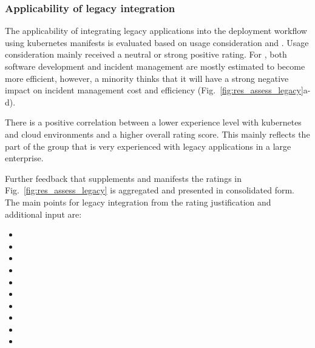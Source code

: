 \documentclass[../main.tex]{subfiles}
\begin{document}
    \subsubsection{Applicability of legacy integration}

    The applicability of integrating legacy applications into the deployment workflow using \gls{kubernetes} manifests is evaluated based on usage consideration and .
    Usage consideration mainly received a neutral or strong positive rating.
    For , both software development and incident management are mostly estimated to become more efficient, however, a minority thinks that it will have a strong negative impact on incident management cost and efficiency (Fig.~\ref{fig:res_assess_legacy}a-d).

    

    There is a positive correlation between a lower experience level with \gls{kubernetes} and \gls{cloud} environments and a higher overall rating score.
    This mainly reflects the part of the group that is very experienced with legacy applications in a large enterprise.

    Further feedback that supplements and manifests the ratings in Fig.~\ref{fig:res_assess_legacy} is aggregated and presented in consolidated form.
    The main points for legacy integration from the rating justification and additional input are:
    \begin{itemize}
        \setlength\itemsep{0em}
        \item {}
        \item {}
        \item {}
        \item {}
        \item {}
        \item {}
        \item {}
        \item {}
        \item {}
        \item {}
    \end{itemize}
\end{document}

